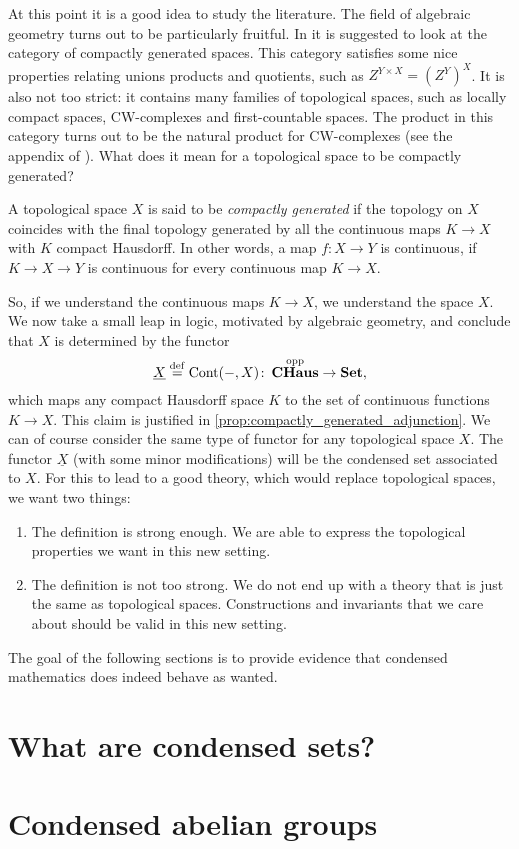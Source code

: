\documentclass{article}
\DeclareMathOperator{\opp}{opp}
\DeclareMathOperator{\Cont}{Cont}
\DeclareMathOperator{\CHaus}{\mathbf{CHaus}}
\begin{document}
At this point it is a good idea to study the literature.
The field of algebraic geometry turns out to be particularly
fruitful. In \cite{Steenrod1967ConvenientCT} it is suggested
to look at the category of compactly generated
spaces. This category satisfies some nice properties
relating unions products and quotients, such as $Z^{Y\times X} = (Z^Y)^X$.
It is also not too strict: it contains
many families of topological spaces, such as locally compact
spaces, CW-complexes and first-countable spaces. The product in this
category turns out to be the natural product for CW-complexes
(see the appendix of \cite{Hat2002AlgebraicT}).
What does it mean for a topological space to be compactly generated?
\begin{definition}
    A topological space $X$ is said to be \emph{compactly generated}
    if the topology on $X$ coincides with the final topology generated
    by all the continuous maps $K \to X$ with $K$ compact Hausdorff.
    In other words, a map $f\colon X \to Y$ is continuous, if
    $K \to X \to Y$ is continuous for every continuous map $K \to X$.
\end{definition}
So, if we understand the continuous maps $K \to X$, we understand
the space $X$. We now take a small leap in logic, motivated by algebraic
geometry, and conclude that $X$ is determined by the functor
\begin{equation*}
    \underline{X} \defeq \Cont(-, X) \colon \CHaus^{\opp} \to \Set,
\end{equation*}
which maps any compact Hausdorff space $K$ to the set of
continuous functions $K \to X$. This claim is justified in
\cref{prop:compactly_generated_adjunction}. We can of course
consider the same type of functor for any topological space
$X$. The functor $\underline{X}$ (with some minor modifications)
will be the condensed set
associated to $X$. For this to lead to a good theory, which
would replace topological spaces, we want two things:
\begin{enumerate}
    \item The definition is strong enough. We are able
          to express the topological properties we want in this
          new setting.
    \item The definition is not too strong. We do not
          end up with a theory that is just the same as topological spaces.
          Constructions and invariants that we care about should be
          valid in this new setting.
\end{enumerate}
The goal of the following sections is to provide evidence
that condensed mathematics does indeed behave as wanted.

\section{What are condensed sets?}

\begin{prop}
    \label{prop:compactly_generated_adjunction}
\end{prop}

\section{Condensed abelian groups}


\end{document}
